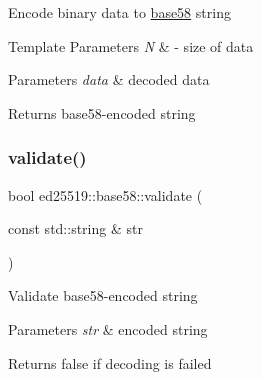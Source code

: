 Encode binary data to \mbox{\hyperlink{namespaceed25519_1_1base58}{base58}} string 
\begin{DoxyTemplParams}{Template Parameters}
{\em N} & -\/ size of data \\
\hline
\end{DoxyTemplParams}

\begin{DoxyParams}{Parameters}
{\em data} & decoded data \\
\hline
\end{DoxyParams}
\begin{DoxyReturn}{Returns}
base58-\/encoded string 
\end{DoxyReturn}
\mbox{\label{namespaceed25519_1_1base58_a2b3ccbfdccfbcc3125de0070e5b37e67}} 
\subsubsection{\texorpdfstring{validate()}{validate()}}
{\footnotesize\ttfamily bool ed25519\+::base58\+::validate (\begin{DoxyParamCaption}\item[{const std\+::string \&}]{str }\end{DoxyParamCaption})}

Validate base58-\/encoded string 
\begin{DoxyParams}{Parameters}
{\em str} & encoded string \\
\hline
\end{DoxyParams}
\begin{DoxyReturn}{Returns}
false if decoding is failed 
\end{DoxyReturn}
